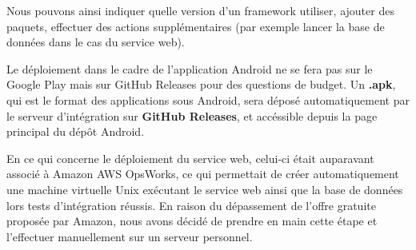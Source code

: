 Nous pouvons ainsi indiquer quelle version d'un framework utiliser, ajouter des paquets, effectuer des actions supplémentaires (par exemple lancer la base de données dans le cas du service web).

Le déploiement dans le cadre de l’application Android ne se fera pas sur le Google Play mais sur GitHub Releases pour des questions de budget. Un \textbf{.apk}, qui est le format des applications sous Android, sera déposé automatiquement par le serveur d’intégration sur \textbf{GitHub Releases}, et accéssible depuis la page principal du dépôt Android.

En ce qui concerne le déploiement du service web, celui-ci était auparavant associé à Amazon AWS OpsWorks, ce qui permettait de créer automatiquement une machine virtuelle Unix exécutant le service web ainsi que la base de données lors tests d'intégration réussis. En raison du dépassement de l'offre gratuite proposée par Amazon, nous avons décidé de prendre en main cette étape et l'effectuer manuellement sur un serveur personnel.